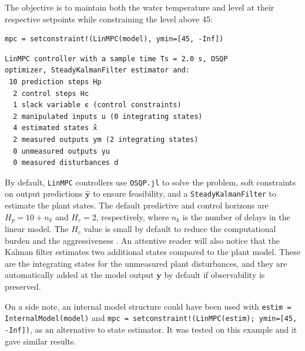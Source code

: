 The objective is to maintain both the water temperature and level at their respective setpoints while constraining the level above 45:
\begin{verbatim}
mpc = setconstraint!(LinMPC(model), ymin=[45, -Inf])
\end{verbatim}
\spacerepl
\begin{verbatim}
LinMPC controller with a sample time Ts = 2.0 s, OSQP
optimizer, SteadyKalmanFilter estimator and:
 10 prediction steps Hp
  2 control steps Hc
  1 slack variable ϵ (control constraints)
  2 manipulated inputs u (0 integrating states)
  4 estimated states x̂
  2 measured outputs ym (2 integrating states)
  0 unmeasured outputs yu
  0 measured disturbances d
\end{verbatim}
By default, \texttt{LinMPC} controllers use \texttt{OSQP.jl} \citep{osqp} to solve the problem, soft constraints on output predictions $\mathbf{\hat y}$ to ensure feasibility, and a \texttt{SteadyKalmanFilter} to estimate the plant states. The default predictive and control horizons are $H_p = 10 + n_k$ and $H_c = 2$, respectively, where $n_k$ is the number of delays in the linear model. The $H_c$ value is small by default to reduce the computational burden and the aggressiveness \citep{mpcHcAnalysis}. An attentive reader will also notice that the Kalman filter estimates two additional states compared to the plant model. These are the integrating states for the unmeasured plant disturbances, and they are automatically added at the model output $\mathbf{y}$ by default if observability is preserved.

On a side note, an internal model structure could have been used with \texttt{estim = InternalModel(model)} and \texttt{mpc = setconstraint!(LinMPC(estim); ymin=[45, -Inf])}, as an alternative to state estimator. It was tested on this example and it gave similar results.


